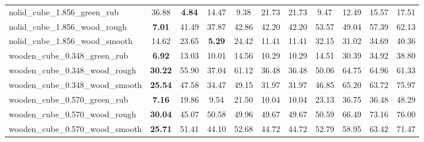 \begin{table}[H]
{\begin{tabular}{l cccccccccc}
        nolid\_cube\_1.856\_green\_rub & 36.88 & \textbf{4.84} & 14.47 & 9.38 & 21.73 & 21.73 & 9.47 & 12.49 & 15.57 & 17.51 \\
        nolid\_cube\_1.856\_wood\_rough & \textbf{7.01} & 41.49 & 37.87 & 42.86 & 42.20 & 42.20 & 53.57 & 49.04 & 57.39 & 62.13 \\
        nolid\_cube\_1.856\_wood\_smooth & 14.62 & 23.65 & \textbf{5.29} & 24.42 & 11.41 & 11.41 & 32.15 & 31.02 & 34.69 & 40.36 \\
        wooden\_cube\_0.348\_green\_rub & \textbf{6.92} & 13.03 & 10.01 & 14.56 & 10.29 & 10.29 & 14.51 & 30.39 & 34.92 & 38.80 \\
        wooden\_cube\_0.348\_wood\_rough & \textbf{30.22} & 55.90 & 37.04 & 61.12 & 36.48 & 36.48 & 50.06 & 64.75 & 64.96 & 61.33 \\
        wooden\_cube\_0.348\_wood\_smooth & \textbf{25.54} & 47.58 & 34.47 & 49.15 & 31.97 & 31.97 & 46.85 & 65.20 & 63.72 & 75.97 \\
        wooden\_cube\_0.570\_green\_rub & \textbf{7.16} & 19.86 & 9.54 & 21.50 & 10.04 & 10.04 & 23.13 & 36.75 & 36.48 & 48.29 \\
        wooden\_cube\_0.570\_wood\_rough & \textbf{30.04} & 45.07 & 50.58 & 49.96 & 49.67 & 49.67 & 50.59 & 66.49 & 73.16 & 76.00 \\
        wooden\_cube\_0.570\_wood\_smooth & \textbf{25.71} & 51.41 & 44.10 & 52.68 & 44.72 & 44.72 & 52.79 & 58.95 & 63.42 & 71.47 \\
        \bottomrule
    \end{tabular}
    }
\end{table}
